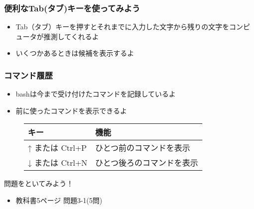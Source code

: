 \begin{frame}
    \frametitle{便利なTab(タブ)キーを使ってみよう}
    \begin{itemize}
        \item Tab（タブ）キーを押すとそれまでに入力した文字から残りの文字をコンピュータが推測してくれるよ
        \item いくつかあるときは候補を表示するよ
    \end{itemize}
    \begin{figure}[h]
        \centering
        
    \end{figure}
\end{frame}

\begin{frame}
    \frametitle{コマンド履歴}
    \begin{itemize}
        \item bashは今まで受け付けたコマンドを記録しているよ
        \item 前に使ったコマンドを表示できるよ
    \end{itemize}
    \begin{figure}[h]
        \center
        \begin{tabular}{ll}\hline
          キー & 機能 \\ \hline
          ↑ または Ctrl+P & ひとつ前のコマンドを表示\\
          ↓ または Ctrl+N & ひとつ後ろのコマンドを表示\\ \hline
        \end{tabular}
    \end{figure}
\end{frame}

\begin{frame}
    \begin{exampleblock}{問題をといてみよう！}
        \begin{itemize}
            \item 教科書5ページ 問題3-1(5問)
        \end{itemize}
    \end{exampleblock} 
\end{frame}

